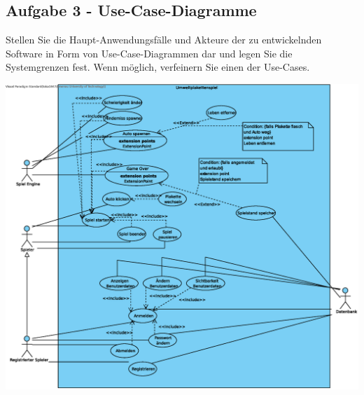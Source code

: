     
    \subsection{Aufgabe 3 - Use-Case-Diagramme}
    
        \begin{aufgabe}
            Stellen Sie die Haupt-Anwendungsfälle und Akteure der zu entwickelnden Software in Form von Use-Case-Diagrammen dar und legen Sie die Systemgrenzen fest. Wenn möglich, verfeinern Sie einen der Use-Cases.
        \end{aufgabe}
    
        \begin{loesung}\:
            \clearpage
            \includegraphics[width=\columnwidth]{res/seminar2-3.eps}
        \end{loesung}

